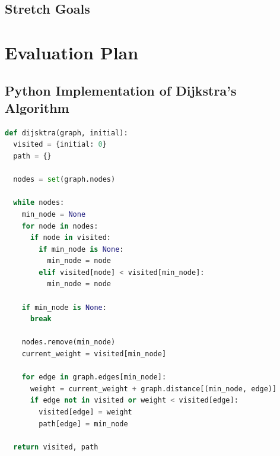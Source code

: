 \documentclass[a4paper,12pt,titlepage]{article}
\begin{document}
\subsection{Stretch Goals}

\newpage
\section{Evaluation Plan}


\newpage
{}




\newpage

\begin{appendices}
\section{Python Implementation of Dijkstra's Algorithm}
\begin{lstlisting}[language=Python, caption=Example Implementation from GitHub. \cite{Root}]
def dijsktra(graph, initial):
  visited = {initial: 0}
  path = {}

  nodes = set(graph.nodes)

  while nodes:
    min_node = None
    for node in nodes:
      if node in visited:
        if min_node is None:
          min_node = node
        elif visited[node] < visited[min_node]:
          min_node = node

    if min_node is None:
      break

    nodes.remove(min_node)
    current_weight = visited[min_node]

    for edge in graph.edges[min_node]:
      weight = current_weight + graph.distance[(min_node, edge)]
      if edge not in visited or weight < visited[edge]:
        visited[edge] = weight
        path[edge] = min_node

  return visited, path
\end{lstlisting}

\end{appendices}
\end{document}
